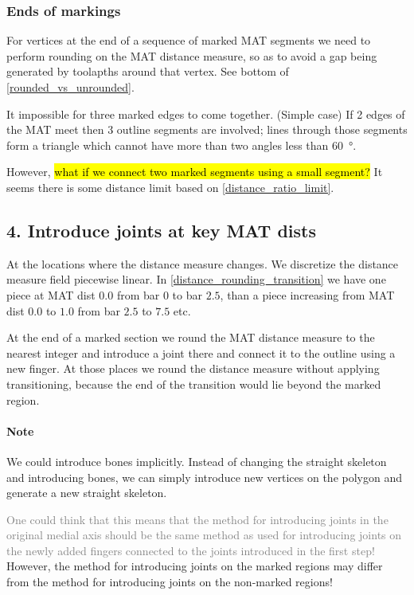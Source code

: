 \subsubsection{Ends of markings}
For vertices at the end of a sequence of marked MAT segments we need to perform rounding on the MAT distance measure, so as to avoid a gap being generated by toolapths around that vertex.
See bottom of \cref{rounded_vs_unrounded}.

It impossible for three marked edges to come together.
(Simple case) If 2 edges of the MAT meet then 3 outline segments are involved; lines through those segments form a triangle which cannot have more than two angles less than \SI{60}{\degree}.

However, \hl{what if we connect two marked segments using a small segment?}
It seems there is some distance limit based on \cref{distance_ratio_limit}.






\subsection{4. Introduce joints at key MAT dists}
At the locations where the distance measure changes.
We discretize the distance measure field piecewise linear.
In \cref{distance_rounding_transition} we have one piece at MAT dist $0.0$ from bar $0$ to bar $2.5$, than a piece increasing from MAT dist $0.0$ to $1.0$ from bar $2.5$ to $7.5$ etc.

At the end of a marked section we round the MAT distance measure to the nearest integer and introduce a joint there and connect it to the outline using a new finger.
At those places we round the distance measure without applying transitioning, because the end of the transition would lie beyond the marked region.
 
\paragraph{Note}
We could introduce bones implicitly.
Instead of changing the straight skeleton and introducing bones,
we can simply introduce new vertices on the polygon and generate a new straight skeleton.

\textcolor{gray}{
One could think that this means that the method for introducing joints in the original medial axis should be the same method as used for introducing joints on the newly added fingers connected to the joints introduced in the first step!
}
However, the method for introducing joints on the marked regions may differ from the method for introducing joints on the non-marked regions!









